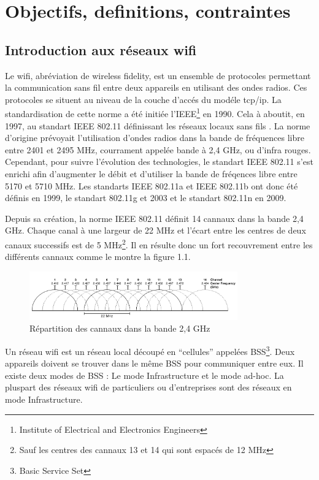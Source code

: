 \chapter{Objectifs, definitions, contraintes}
\section{Introduction aux réseaux wifi}

Le wifi, abréviation de wireless fidelity, est un ensemble de protocoles permettant la communication sans fil entre deux
appareils en utilisant des ondes radios. Ces protocoles se situent au niveau de la couche d'accés du modéle tcp/ip.
La standardisation de cette norme a été initiée l'IEEE\footnote{Institute of Electrical and Electronics Engineers} en 1990.
Cela à aboutit, en 1997, au standart IEEE 802.11 définissant les réseaux locaux sans fils \cite{WFintro}.
La norme d'origine prévoyait l'utilisation d'ondes radios dans la bande de fréquences libre entre 2401 et 2495 MHz\cite{WFband},
courrament appelée bande à 2,4 GHz, ou d'infra rouges. Cependant, pour suivre l'évolution des technologies, le standart IEEE 
802.11 s'est enrichi afin d'augmenter le débit et d'utiliser la bande de fréqences libre entre 5170 et 5710 MHz.
Les standarts IEEE 802.11a et IEEE 802.11b ont donc été définis en 1999, le standart 802.11g et 2003 et le standart 802.11n
en 2009.

Depuis sa création, la norme IEEE 802.11 définit 14 cannaux dans la bande 2,4 GHz. Chaque canal à une largeur de 22 MHz et 
l'écart entre les centres de deux canaux successifs est de 5 MHz\footnote{Sauf les centres des cannaux 13 et 14 qui sont espacés
de 12 MHz}. Il en résulte donc un fort recouvrement entre les différents cannaux comme le montre la figure 1.1.

\begin{figure}
   \centering
   \includegraphics[width=0.8\textwidth,natwidth=610,natheight=642]{images/cannaux.png}
   \caption{Répartition des cannaux dans la bande 2,4 GHz}
\end{figure}

Un réseau wifi est un réseau local découpé en ``cellules'' appelées BSS\footnote{Basic Service Set}. Deux appareils
doivent se trouver dans le même BSS pour communiquer entre eux. Il existe deux modes de BSS : Le mode Infrastructure et le
mode ad-hoc\cite{WFfunc2}. La pluspart des réseaux wifi de particuliers ou d'entreprises sont des réseaux en mode Infrastructure.

